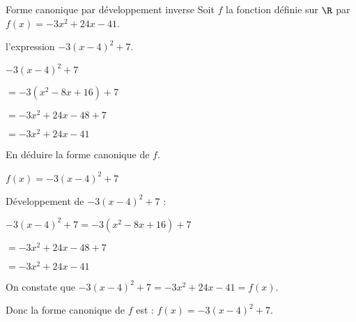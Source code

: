 \begin{EXO}{Forme canonique par développement inverse}{}
Soit $f$ la fonction définie sur $\R$ par $ f(x) = -3x^2+24x-41$.
\begin{tcbenumerate}[2]
\tcbitem {}  l'expression $-3(x-4)^2+7$.

\begin{crep}
$-3(x-4)^2+7 $

$= -3(x^2-8x+16)+7 $

$= -3x^2+24x-48+7 $

$= -3x^2+24x-41$
\end{crep}

\tcbitem {} En déduire la forme canonique de $f$.

\begin{crep}
$f(x) = -3(x-4)^2+7$
\end{crep}
\end{tcbenumerate}

\exocorrection

\begin{tcbenumerate}[2]
\tcbitem Développement de $-3(x-4)^2+7$ :

$-3(x-4)^2+7 = -3(x^2-8x+16)+7$

$= -3x^2+24x-48+7$

$= -3x^2+24x-41$

\tcbitem On constate que $-3(x-4)^2+7 = -3x^2+24x-41 = f(x)$.

Donc la forme canonique de $f$ est : $f(x) = -3(x-4)^2+7$.
\end{tcbenumerate}
\end{EXO}